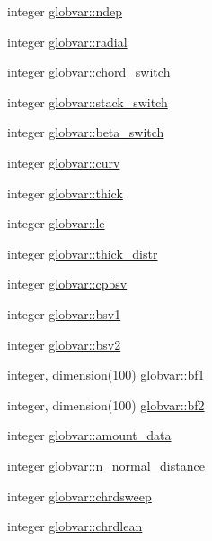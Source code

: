 \begin{DoxyCompactItemize}
\item 
integer \hyperlink{namespaceglobvar_aee337eea7ab22193aa48bfd1dfe306d1}{globvar\+::ndep}
\item 
integer \hyperlink{namespaceglobvar_aff92f6272423850960736a1d45667121}{globvar\+::radial}
\item 
integer \hyperlink{namespaceglobvar_a43852fe59e4847373e97ec738fcd12cf}{globvar\+::chord\+\_\+switch}
\item 
integer \hyperlink{namespaceglobvar_a795725a0e45ccc9a453ce62e4311aa86}{globvar\+::stack\+\_\+switch}
\item 
integer \hyperlink{namespaceglobvar_ac2f0dd583ec6012e046c832b73410878}{globvar\+::beta\+\_\+switch}
\item 
integer \hyperlink{namespaceglobvar_afae25681092536554c592050d73058fb}{globvar\+::curv}
\item 
integer \hyperlink{namespaceglobvar_afed76bd4905177b5881960ecfcc1e706}{globvar\+::thick}
\item 
integer \hyperlink{namespaceglobvar_acb71a0210b9caf3ad597c781aa0fdbda}{globvar\+::le}
\item 
integer \hyperlink{namespaceglobvar_a025b952856d8a23aaaf7b150c59fd537}{globvar\+::thick\+\_\+distr}
\item 
integer \hyperlink{namespaceglobvar_ad4f4c8cbe26bb1d58d242e5ea327bd8f}{globvar\+::cpbsv}
\item 
integer \hyperlink{namespaceglobvar_af5f7b2251f75b81eeb565207d1b40aab}{globvar\+::bsv1}
\item 
integer \hyperlink{namespaceglobvar_a50c172f04174a319fcbf69991adb2a97}{globvar\+::bsv2}
\item 
integer, dimension(100) \hyperlink{namespaceglobvar_aed39a88b831b27b5b463d57a00a79f88}{globvar\+::bf1}
\item 
integer, dimension(100) \hyperlink{namespaceglobvar_ac00ea6ddd54af474c45fe888882c8a54}{globvar\+::bf2}
\item 
integer \hyperlink{namespaceglobvar_ace5a9b2d41e77ec26c678a7755174bf2}{globvar\+::amount\+\_\+data}
\item 
integer \hyperlink{namespaceglobvar_ae3ba2421a9e1256590002f63d594e18b}{globvar\+::n\+\_\+normal\+\_\+distance}
\item 
integer \hyperlink{namespaceglobvar_a5564253dd9ebb8998b6205940d9419d7}{globvar\+::chrdsweep}
\item 
integer \hyperlink{namespaceglobvar_a227f30590ee8d9741dfbdb6a81b7bbfa}{globvar\+::chrdlean}
\item 

\end{DoxyCompactItemize}
